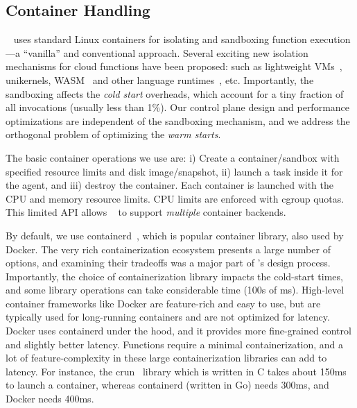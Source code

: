 \subsection{Container Handling}
\label{sec:design:ctr}

\sysname~ uses standard Linux containers for isolating and sandboxing function execution---a ``vanilla'' and conventional approach.  
Several exciting new isolation mechanisms for cloud functions
have been proposed: such as lightweight VMs~\cite{firecracker-nsdi20}, unikernels, WASM~\cite{shillaker2020faasm} and other language runtimes~\cite{graalvm}, etc. 
Importantly, the sandboxing affects the \emph{cold start} overheads, which account for a tiny fraction of all invocations (usually less than 1\%).
Our control plane design and performance optimizations are independent of the sandboxing mechanism, and we address the orthogonal problem of optimizing the \emph{warm starts}. 

The basic container operations we use are: i) Create a container/sandbox with specified resource limits and disk image/snapshot, ii) launch a task inside it for the agent, and iii) destroy the container.
Each container is launched with the CPU and memory resource limits. CPU limits are enforced with cgroup quotas. 
This limited API allows \sysname~ to support \emph{multiple} container backends.


By default, we use containerd~\cite{containerd}, which is popular container library, also used by Docker. 
The very rich containerization ecosystem presents a large number of options, and examining their tradeoffs was a major part of \sysname's design process.
Importantly, the choice of containerization library impacts the cold-start times, and some library operations can take considerable time (100s of ms). 
High-level container frameworks like Docker are feature-rich and easy to use, but are typically used for long-running containers and are not optimized for latency.
Docker uses containerd under the hood, and it provides  more fine-grained control and slightly better latency.
Functions require a minimal containerization, and a lot of feature-complexity in these large containerization libraries can add to latency.
For instance, the crun~\cite{crun} library which is written in C takes about 150ms to launch a container, whereas containerd (written in Go) needs 300ms, and Docker needs 400ms. 

